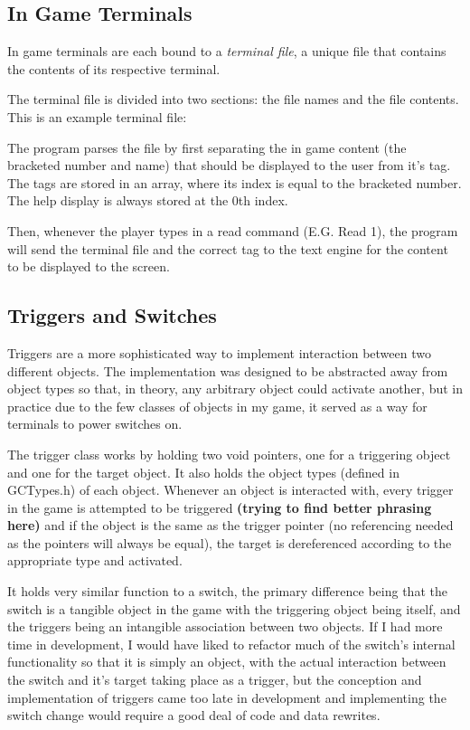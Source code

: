 \documentclass{article}
\begin{document}
\subsection{In Game Terminals}
In game terminals are each bound to a \emph{terminal file}, a unique file that contains the contents of its respective terminal.

The terminal file is divided into two sections: the file names and the file contents. This is an example terminal file:



The program parses the file by first separating the in game content (the bracketed number and name) that should be displayed to the user from it's tag. The tags are stored in an array, where its index is equal to the bracketed number. The help display is always stored at the 0th index.

Then, whenever the player types in a read command (E.G. Read 1), the program will send the terminal file and the correct tag to the text engine for the content to be displayed to the screen.

\subsection{Triggers and Switches}
Triggers are a more sophisticated way to implement interaction between two different objects. The implementation was designed to be abstracted away from object types so that, in theory, any arbitrary object could activate another, but in practice due to the few classes of objects in my game, it served as a way for terminals to power switches on. 

The trigger class works by holding two void pointers, one for a triggering object and one for the target object. It also holds the object types (defined in GCTypes.h) of each object. Whenever an object is interacted with, every trigger in the game is attempted to be triggered \textbf{(trying to find better phrasing here)} and if the object is the same as the trigger pointer (no referencing needed as the pointers will always be equal), the target is dereferenced according to the appropriate type and activated.

It holds very similar function to a switch, the primary difference being that the switch is a tangible object in the game with the triggering object being itself, and the triggers being an intangible association between two objects. If I had more time in development, I would have liked to refactor much of the switch's internal functionality so that it is simply an object, with the actual interaction between the switch and it's target taking place as a trigger, but the conception and implementation of triggers came too late in development and implementing the switch change would require a good deal of code and data rewrites.
\end{document}
